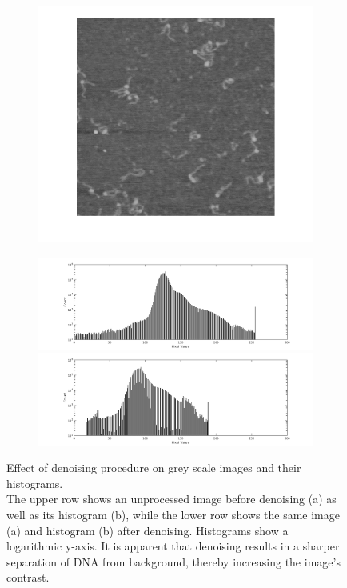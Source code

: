 \documentclass{article}
\begin{document}
\begin{figure}[htb!]
\begin{subfigure}{0.28\textwidth}
		\includegraphics[width=\linewidth]{afterDenoise_img.png}
		\caption{}
		\label{fig:denoising_imgs}
	\end{subfigure}
	\begin{subfigure}{0.7\textwidth}
		\includegraphics[width=\linewidth]{beforeDenoise_histogram.png}
		
		\vspace{0.1cm}
		
		\includegraphics[width=\linewidth]{afterDenoise_histogram.png}
		\caption{}
		\label{fig:denoising_histograms}
	\end{subfigure}
	\caption{Effect of denoising procedure on grey scale images and their histograms.\\
		The upper row shows an unprocessed image before denoising (a) as well as its histogram (b), while the lower row shows the same image (a) and histogram (b) after denoising. Histograms show a logarithmic y-axis. It is apparent that denoising results in a sharper separation of DNA from background, thereby increasing the image's contrast.}
	\label{fig:denoising}
\end{figure}
\end{document}
